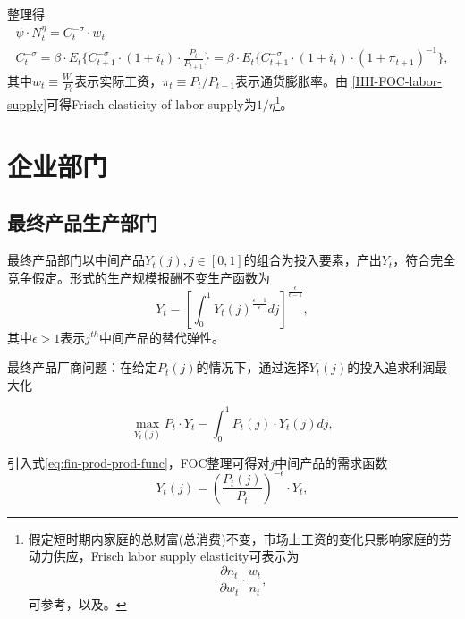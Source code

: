 整理得
\begin{gather}
  \label{HH-FOC-labor-supply}
  \psi \cdot N_t^{\eta} = C_t^{-\sigma} \cdot w_t \\
\label{HH-FOC-euler-consumption}
  C_t^{-\sigma} = \beta \cdot E_t\{ C_{t+1}^{-\sigma} \cdot (1+i_t) \cdot \frac{P_t}{P_{t+1}}\}=\beta \cdot E_t\{ C_{t+1}^{-\sigma} \cdot (1+i_t) \cdot ( 1+\pi_{t+1} )^{-1}\},
\end{gather}
其中$w_t \equiv \frac{W_t}{P_t}$表示实际工资，$\pi_t \equiv P_t/P_{t-1}$表示通货膨胀率。由  \eqref{HH-FOC-labor-supply}可得Frisch elasticity of labor supply为$1/\eta$\footnote{假定短时期内家庭的总财富(总消费)不变，市场上工资的变化只影响家庭的劳动力供应，Frisch labor supply elasticity\citep{Frisch:1932wk,Frisch:1959jt}可表示为
  \begin{equation*}
    \frac{\partial n_t}{\partial w_t} \cdot \frac{w_t}{n_t},
  \end{equation*}
可参考\cite[pp.279]{Heer:2009ig}，以及\cite{Christiano:2010wla}。}。



\section{企业部门}
\label{sec:Basic-NK-model-firm-sector}

\subsection{最终产品生产部门}
\label{sec:Basic-NK-model-final-produc-firm-sector}
最终产品部门以中间产品$Y_t(j), j \in [0,1]$的组合为投入要素，产出$Y_t$，符合完全竞争假定。\cite{Dixit:1977tv}形式的生产规模报酬不变生产函数为
\begin{equation}
  \label{eq:fin-prod-prod-func}
  Y_t = \left[ \int_{0}^{1} Y_t(j)^{\frac{\epsilon - 1}{\epsilon}} dj\right]^{\frac{\epsilon}{\epsilon - 1}},
\end{equation}
其中$\epsilon > 1$表示$j^{th}$中间产品的替代弹性。

最终产品厂商问题：在给定$P_t(j)$的情况下，通过选择$Y_t(j)$的投入追求利润最大化

\begin{equation}
  \label{eq:fin-prod-problem-max}
  \max_{Y_t(j)} P_t \cdot Y_t - \int_{0}^{1} P_t(j) \cdot Y_t(j) dj ,
\end{equation}

引入式\eqref{eq:fin-prod-prod-func}，FOC整理可得对$j$中间产品的需求函数
\begin{equation}
  \label{eq:demand-for-intm-j}
  Y_t(j) = \left( \frac{P_t(j)}{P_t}
\right)^{-\epsilon} \cdot Y_t,
\end{equation}

